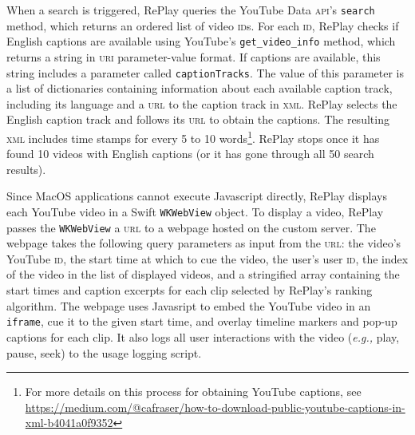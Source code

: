 When a search is triggered, RePlay queries the YouTube Data \textsc{api}'s \texttt{search} method, which returns an ordered list of video \textsc{id}s. For each \textsc{id}, RePlay checks if English captions are available using YouTube's \texttt{get\_video\_info} method, which returns a string in \textsc{uri} parameter-value format. If captions are available, this string includes a parameter called \texttt{captionTracks}. The value of this parameter is a list of dictionaries containing information about each available caption track, including its language and a \textsc{url} to the caption track in \textsc{xml}. RePlay selects the English caption track and follows its \textsc{url} to obtain the captions. The resulting \textsc{xml} includes time stamps for every 5 to 10 words\footnote{For more details on this process for obtaining YouTube captions, see \url{https://medium.com/@cafraser/how-to-download-public-youtube-captions-in-xml-b4041a0f9352}}. RePlay stops once it has found 10 videos with English captions (or it has gone through all 50 search results).

Since MacOS applications cannot execute Javascript directly, RePlay displays each YouTube video in a Swift \texttt{WKWebView} object. To display a video, RePlay passes the \texttt{WKWebView} a \textsc{url} to a webpage hosted on the custom server. The webpage takes the following query parameters as input from the \textsc{url}: the video's YouTube \textsc{id}, the start time at which to cue the video, the user's user \textsc{id}, the index of the video in the list of displayed videos, and a stringified array containing the start times and caption excerpts for each clip selected by RePlay's ranking algorithm. The webpage uses Javasript to embed the YouTube video in an \texttt{iframe}, cue it to the given start time, and overlay timeline markers and pop-up captions for each clip. It also logs all user interactions with the video (\textit{e.g.,} play, pause, seek) to the usage logging script.

